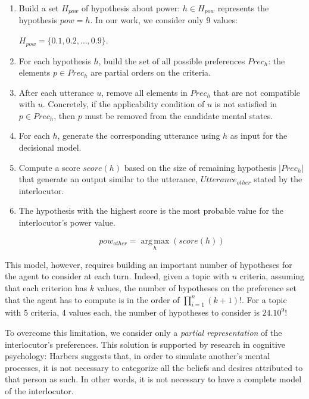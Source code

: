 \documentclass[sigconf]{aamas}  %
\begin{document}
	\begin{enumerate}
		\item Build a set $H_{pow}$ of hypothesis about power: $h\in H_{pow}$ represents the hypothesis $pow=h$. In our work, we consider only 9 values: 
		
		$H_{pow}=\{0.1, 0.2, \ldots, 0.9\}$.
		\item For each hypothesis $h$, build the set of all possible preferences $Prec_h$: the elements $p\in Prec_h$ are partial orders on the criteria.
		\item After each utterance $u$, remove all elements in $Prec_h$ that are not compatible with $u$. Concretely, if the applicability condition of $u$ is not satisfied in $p\in Prec_h$, then $p$ must be removed from the candidate mental states.
		\item For each $h$, generate the corresponding utterance using $h$ as input for the decisional model.
		\item Compute a score $score(h)$ based on the size of remaining hypothesis $|Prec_h|$ that generate an output similar to the utterance, $Utterance_{other}$ stated by the interlocutor. 
		\item 	The hypothesis with the highest score is the most probable value for the interlocutor's power value.
		
		\begin{equation}
		pow_{other} = \operatorname*{arg\,max}_{h} (score(h))
		\end{equation}
		
	\end{enumerate}
	
	This model, however, requires building an important number of hypotheses for the agent to consider at each turn. Indeed, given a topic with $n$ criteria, assuming that each criterion has $k$ values, the number of hypotheses on the preference set that the agent has to compute is in the order of  $\prod_{i=1}^n (k+1)!$. For a topic with 5 criteria, 4 values each, the number of hypotheses to consider is $24.10^9$!
	
	To overcome this limitation, we consider only a \textit{partial representation} of the interlocutor's preferences. This solution is supported  by research in cognitive psychology: Harbers \cite{harbers2009modeling} suggests that, in order to simulate another's mental processes, it is not necessary to categorize all the beliefs and desires attributed to that person as such. In other words, it is not necessary to have a complete model of the interlocutor.
	
\end{document}
